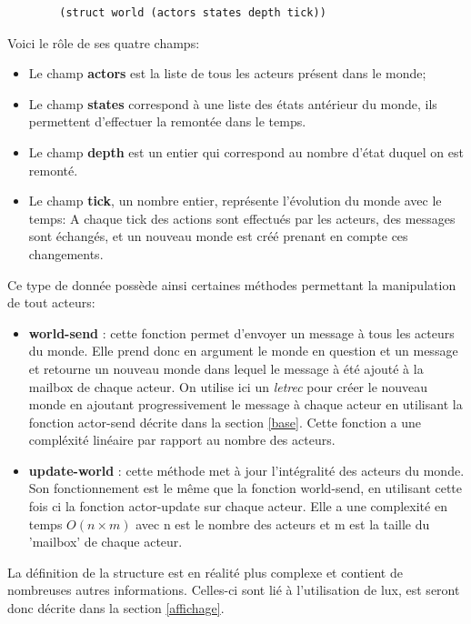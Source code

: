 \documentclass[a4paper,10pt]{article}
\begin{document}
        \begin{lstlisting}
        (struct world (actors states depth tick))
        \end{lstlisting}
Voici le rôle de ses quatre champs: \\
\begin{itemize}
    \item Le champ \textbf{actors} est la liste de tous les acteurs présent dans le monde; \\
    \item Le champ \textbf{states} correspond à une liste des états antérieur du monde, ils permettent d'effectuer la remontée dans le temps. \\
    \item Le champ \textbf{depth} est un entier qui correspond au nombre d'état duquel on est remonté. \\
    \item Le champ \textbf{tick}, un nombre entier, représente l'évolution du monde avec le temps: A chaque tick des actions sont effectués par les acteurs, des messages sont échangés, et un nouveau monde est créé prenant en compte ces changements.\\
\end{itemize}
Ce type de donnée possède ainsi certaines méthodes permettant la manipulation de tout acteurs:\\
\begin{itemize}
    \item \textbf{world-send} : cette fonction permet d'envoyer un message à tous les acteurs du monde. Elle prend donc en argument le monde en question et un message et retourne un nouveau monde dans lequel le message à été ajouté à la mailbox de chaque acteur. On utilise ici un \textit{letrec} pour créer le nouveau monde en ajoutant progressivement le message à chaque acteur en utilisant la fonction actor-send décrite dans la section \ref{base}. Cette fonction a une compléxité linéaire par rapport au nombre des acteurs. \\
    \item \textbf{update-world} : cette méthode met à jour l'intégralité des acteurs du monde. Son fonctionnement est le même que la fonction world-send, en utilisant cette fois ci la fonction actor-update sur chaque acteur. Elle a une complexité en temps $O(n \times m)$ avec n est le nombre des acteurs et m est la taille du 'mailbox' de chaque acteur. \\
\end{itemize}
La définition de la structure est en réalité plus complexe et contient de nombreuses autres informations. Celles-ci sont lié à l'utilisation de lux, est seront donc décrite dans la section \ref{affichage}.
\end{document}
